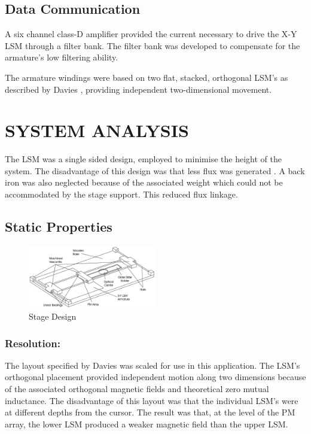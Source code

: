 \documentclass[10pt,twocolumn]{witseiepaper}
\begin{document}
\subsection{Data Communication}

A six channel class-D amplifier provided the current necessary to drive the
X-Y LSM through a filter bank. The filter bank was developed to compensate for
the armature's low filtering ability.

The armature windings were based on two flat, stacked, orthogonal LSM's as
described by Davies \cite{Simon}, providing independent two-dimensional
movement.

\section{SYSTEM ANALYSIS}

The LSM was a single sided design, employed to minimise the height of the
system.  The disadvantage of this design was that less flux was
generated \cite{Linsync}.  A back iron was also neglected because of the
associated weight which could not be accommodated by the stage support.  This
reduced flux linkage.

\subsection{Static Properties}

\begin{figure}[hb!]
	\centering
		\includegraphics[width=0.50\textwidth]{../../Drawings/Stage-Final.pdf}
	\caption{Stage Design}
	\label{fig:Stage}
\end{figure}

\subsubsection*{Resolution:}

The layout specified by Davies \cite{Simon} was scaled for use in this
application.  The LSM's orthogonal placement provided independent motion along
two dimensions because of the associated orthogonal magnetic fields and
theoretical zero mutual inductance.  The disadvantage of this layout was that
the individual LSM's were at different depths from the cursor.  The result was
that, at the level of the PM array, the lower LSM produced a weaker magnetic
field than the upper LSM.
\end{document}
